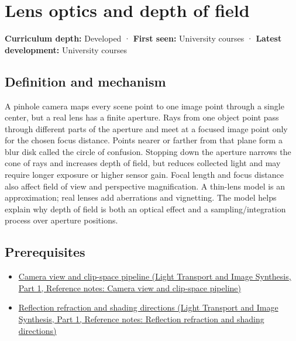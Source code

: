 \hypertarget{appendix-21f8456e2629}{}\label{referencestart:appendix-21f8456e2629}
\section{Lens optics and depth of field}\label{appendix-21f8456e2629-lens-optics-and-depth-of-field}

\hypertarget{appendix-21f8456e2629-lens-optics-and-depth-of-field}{}

\textbf{Curriculum depth:} Developed · \textbf{First seen:} University courses · \textbf{Latest development:} University courses

\begin{allmightroledefinition}

\subsection{Definition and mechanism}\label{appendix-21f8456e2629-definition-and-mechanism}

\hypertarget{appendix-21f8456e2629-definition-and-mechanism}{}

A pinhole camera maps every scene point to one image point through a single center, but a real lens has a finite aperture. Rays from one object point pass through different parts of the aperture and meet at a focused image point only for the chosen focus distance. Points nearer or farther from that plane form a blur disk called the circle of confusion. Stopping down the aperture narrows the cone of rays and increases depth of field, but reduces collected light and may require longer exposure or higher sensor gain. Focal length and focus distance also affect field of view and perspective magnification. A thin-lens model is an approximation; real lenses add aberrations and vignetting. The model helps explain why depth of field is both an optical effect and a sampling/integration process over aperture positions.

\end{allmightroledefinition}

\subsection{Prerequisites}\label{appendix-21f8456e2629-prerequisites}

\hypertarget{appendix-21f8456e2629-prerequisites}{}

\begin{itemize}
\tightlist
\item
  \href{../04-Light-Transport-and-Image-Synthesis-P01/main.pdf\#nameddest=appendix-1c07d64f5e70}{Camera view and clip-space pipeline (Light Transport and Image Synthesis, Part 1, Reference notes: Camera view and clip-space pipeline)}
\item
  \href{../04-Light-Transport-and-Image-Synthesis-P01/main.pdf\#nameddest=appendix-44e00863b4d5}{Reflection refraction and shading directions (Light Transport and Image Synthesis, Part 1, Reference notes: Reflection refraction and shading directions)}
\end{itemize}

